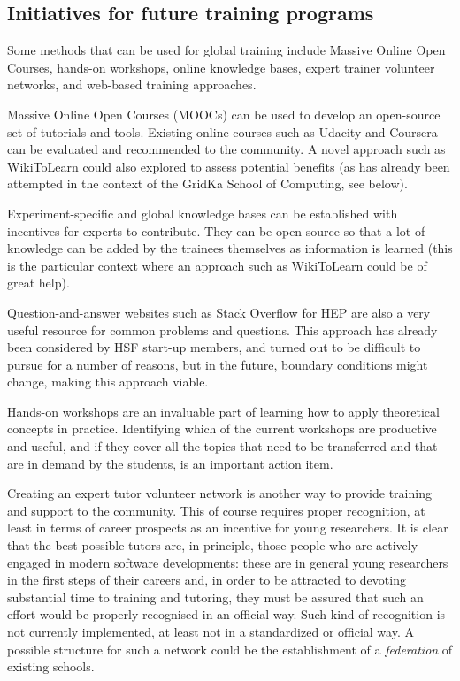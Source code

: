 \documentclass[12pt,a4paper]{article}
\begin{document}
\subsection{Initiatives for future training programs\label{sec:initiatives}} 

Some methods that can be used for global training include Massive Online Open
Courses, hands-on workshops, online knowledge bases, expert trainer volunteer
networks, and web-based training approaches.

Massive Online Open Courses (MOOCs) can be used to develop an open-source set of
tutorials and tools. Existing online courses such as Udacity and Coursera can be
evaluated and recommended to the community. A novel approach such as WikiToLearn
could also explored to assess potential benefits (as has already been attempted
in the context of the GridKa School of Computing, see below).

Experiment-specific and global knowledge bases can be established with
incentives for experts to contribute. They can be open-source so that a lot of
knowledge can be added by the trainees themselves as information is learned
(this is the particular context where an approach such as WikiToLearn could be
of great help).

Question-and-answer websites such as Stack Overflow for HEP are also a very
useful resource for common problems and questions. This approach has already
been considered by HSF start-up members, and turned out to be difficult to
pursue for a number of reasons, but in the future, boundary conditions might
change, making this approach viable.

Hands-on workshops are an invaluable part of learning how to apply theoretical
concepts in practice. Identifying which of the current workshops are productive
and useful, and if they cover all the topics that need to be transferred and
that are in demand by the students, is an important action item.

Creating an expert tutor volunteer network is another way to provide training
and support to the community.
This of course requires proper recognition, at least in terms of career
prospects as an incentive for young researchers. It is clear that the best
possible tutors are, in principle, those people who are actively engaged in
modern software developments: these are in general young researchers in the
first steps of their careers and, in order to be attracted to devoting
substantial time to training and tutoring, they must be assured that such an
effort would be properly recognised in an official way. Such kind of recognition
is not currently implemented, at least not in a standardized or official way. A
possible structure for such a network could be the establishment of a {\em
federation} of existing schools.
\end{document}
